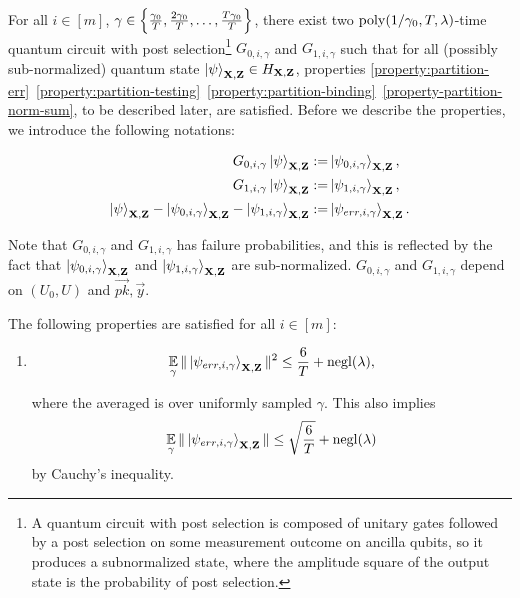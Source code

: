 \begin{lemma}
	For all $i\in[m]$, $\gamma \in \left\{\frac{\gamma_0}{T},\frac{2\gamma_0}{T},\dots,\frac{T\gamma_0}{T}\right\}$, there exist two $\operatorname*{\operatorname{poly}}(1/\gamma_0,T,\lambda)$-time quantum circuit with post selection\footnote{A quantum circuit with post selection is composed of unitary gates followed by a post selection on some measurement outcome on ancilla qubits, so it produces a subnormalized state, where the amplitude square of the output state is the probability of post selection.} $G_{0,i,\gamma}$ and $G_{1,i,\gamma}$ such that for all (possibly sub-normalized)  quantum state $\ket{\psi}_{\mathbf{X},\mathbf{Z}}\in  H_{\mathbf{X},\mathbf{Z}}$,  properties \ref{property:partition-err}~\ref{property:partition-testing}~\ref{property:partition-binding}~\ref{property-partition-norm-sum}, to be described later, are satisfied. Before we describe the properties, we introduce the following notations:  

	\begin{align}
	\label{eq:psi0}	G_{0,i,\gamma}\ket{\psi}_{\mathbf{X},\mathbf{Z}} :=& \ket{\psi_{0,i,\gamma}}_{\mathbf{X},\mathbf{Z}}, \\ 
	\label{eq:psi1}	G_{1,i,\gamma}\ket{\psi}_{\mathbf{X},\mathbf{Z}} :=& \ket{\psi_{1,i,\gamma}}_{\mathbf{X},\mathbf{Z}},  \\
	\label{eq:psierr}	\ket{\psi}_{\mathbf{X},\mathbf{Z}} -\ket{\psi_{0,i,\gamma}}_{\mathbf{X},\mathbf{Z}}- \ket{\psi_{1,i,\gamma}}_{\mathbf{X},\mathbf{Z}} :=&   \ket{\psi_{err,i,\gamma}}_{\mathbf{X},\mathbf{Z}}.
	\end{align}

	Note that $G_{0,i,\gamma}$ and $G_{1,i,\gamma}$ has failure probabilities, and this is reflected by the fact that $\ket{\psi_{0,i,\gamma}}_{\mathbf{X},\mathbf{Z}}$ and $\ket{\psi_{1,i,\gamma}}_{\mathbf{X},\mathbf{Z}}$ are  sub-normalized. $G_{0,i,\gamma}$ and $G_{1,i,\gamma}$ depend on $(U_0,U)$ and $\vec{pk},\vec{y}$.

	The following properties are satisfied for all $i\in[m]$:
	\begin{enumerate}
		\item \label{property:partition-err}  $$\operatorname*{\mathbb{E}}_{\gamma}\|\ket{\psi_{err,i,\gamma}}_{\mathbf{X},\mathbf{Z}}\|^2 \leq \frac{6}{T}+\operatorname{negl}(\lambda),$$

			where the averaged is over uniformly sampled $\gamma$. This also implies
			\begin{align}
				\operatorname*{\mathbb{E}}_{\gamma}\|\ket{\psi_{err,i,\gamma}}_{\mathbf{X},\mathbf{Z}}\| \leq \sqrt{\frac{6}{T}}+\operatorname{negl}(\lambda)
			\end{align}
			by Cauchy's inequality.


\end{enumerate}
\end{lemma}
